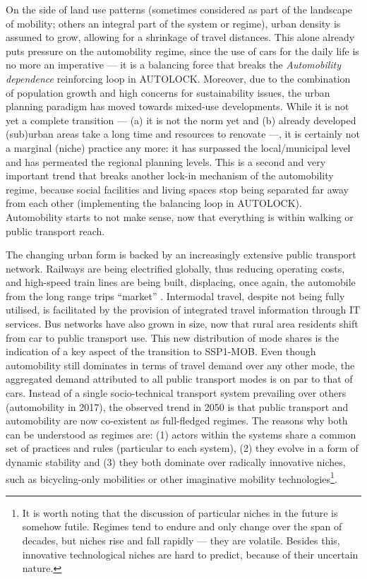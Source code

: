 On the side of land use patterns (sometimes considered as part of the landscape of mobility; others an integral part of the system or regime), urban density is assumed to grow, allowing for a shrinkage of travel distances. This alone already puts pressure on the automobility regime, since the use of cars for the daily life is no more an imperative --- it is a balancing force that breaks the  \emph{Automobility dependence} reinforcing loop in AUTOLOCK. Moreover, due to the combination of population growth and high concerns for sustainability issues, the urban planning paradigm has moved towards mixed-use developments. While it is not yet a complete transition --- (a) it is not the norm yet and (b) already developed (sub)urban areas take a long time and resources to renovate ---, it is certainly not a marginal (niche) practice any more: it has surpassed the local/municipal level and has permeated the regional planning levels. This is a second and very important trend that breaks another lock-in mechanism of the automobility regime, because social facilities and living spaces stop being separated far away from each other (implementing the  balancing loop in AUTOLOCK). Automobility starts to not make sense, now that everything is within walking or public transport reach.

The changing urban form is backed by an increasingly extensive public transport network. Railways are being electrified globally, thus reducing operating costs, and high-speed train lines are being built, displacing, once again, the automobile from the long range trips ``market'' \parencite{vuuren2017_Energylanduse}. Intermodal travel, despite not being fully utilised, is facilitated by the provision of integrated travel information through IT services. Bus networks have also grown in size, now that rural area residents shift from car to public transport use. This new distribution of mode shares is the indication of a key aspect of the transition to SSP1-MOB. Even though automobility still dominates in terms of travel demand over any other mode, the aggregated demand attributed to all public transport modes is on par to that of cars. Instead of a single socio-technical transport system prevailing over others (automobility in 2017), the observed trend in 2050 is that public transport and automobility are now co-existent as full-fledged regimes. The reasons why both can be understood as regimes are: (1) actors within the systems share a common set of practices and rules (particular to each system), (2) they evolve in a form of dynamic stability and (3) they both dominate over radically innovative niches, such as bicycling-only mobilities or other imaginative mobility technologies\footnote{It is worth noting that the discussion of particular niches in the future is somehow futile. Regimes tend to endure and only change over the span of decades, but niches rise and fall rapidly --- they are volatile. Besides this, innovative technological niches are hard to predict, because of their uncertain nature.}.


